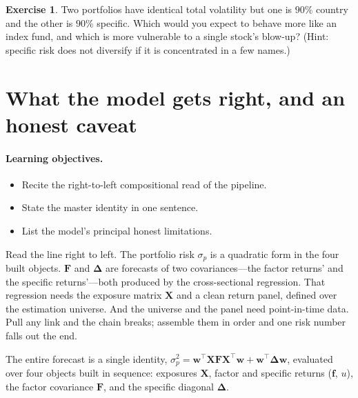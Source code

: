 \documentclass[11pt]{article}
\theoremstyle{definition}
\newtheorem{exercise}{Exercise}[section]
\theoremstyle{plain}
\theoremstyle{remark}
\newcommand{\T}{^{\!\top}}
\newcommand{\wvec}{\mathbf{w}}
\newcommand{\Xmat}{\mathbf{X}}
\newcommand{\Fmat}{\mathbf{F}}
\newcommand{\Del}{\boldsymbol{\Delta}}
\newcommand{\fvec}{\mathbf{f}}
\begin{document}
\begin{exercise}
Two portfolios have identical total volatility but one is $90\%$ country and the other is $90\%$ specific. Which would you expect to behave more like an index fund, and which is more vulnerable to a single stock's blow-up? (Hint: specific risk does not diversify if it is concentrated in a few names.)
\end{exercise}

\section{What the model gets right, and an honest caveat}\label{sec:caveat}

\paragraph{Learning objectives.}
\begin{itemize}[leftmargin=1.4em,nosep]
  \item Recite the right-to-left compositional read of the pipeline.
  \item State the master identity in one sentence.
  \item List the model's principal honest limitations.
\end{itemize}

\begin{intuition}
Read the line right to left. The portfolio risk $\sigma_p$ is a quadratic form in the four built objects. $\Fmat$ and $\Del$ are forecasts of two covariances---the factor returns' and the specific returns'---both produced by the cross-sectional regression. That regression needs the exposure matrix $\Xmat$ and a clean return panel, defined over the estimation universe. And the universe and the panel need point-in-time data. Pull any link and the chain breaks; assemble them in order and one risk number falls out the end.
\end{intuition}

\begin{keyresult}
The entire forecast is a single identity, $\sigma_p^2 = \wvec\T\Xmat\Fmat\Xmat\T\wvec + \wvec\T\Del\wvec$, evaluated over four objects built in sequence: exposures $\Xmat$, factor and specific returns ($\fvec$, $u$), the factor covariance $\Fmat$, and the specific diagonal $\Del$.
\end{keyresult}
\end{document}
